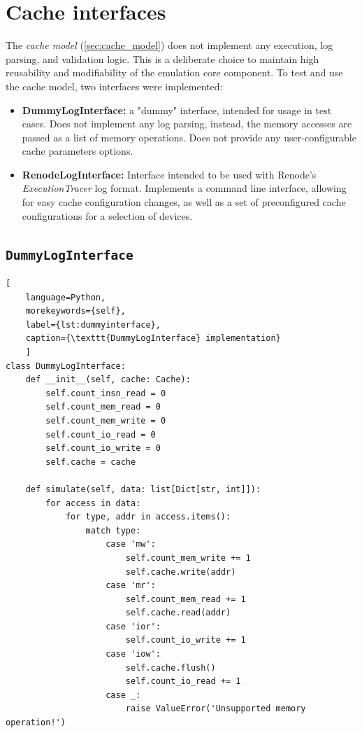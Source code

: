 \section{Cache interfaces}

The \textit{cache model} (\ref{sec:cache_model}) does not implement any execution, log parsing, and validation logic. This is a deliberate choice to maintain high reusability and modifiability
of the emulation core component. To test and use the cache model, two interfaces were implemented:

\begin{itemize}
	\item \textbf{DummyLogInterface:} a "dummy" interface, intended for usage in test cases. Does not implement any log parsing, instead, the memory accesses are passed as a list of
        memory operations. Does not provide any user-configurable cache parameters options.
    \item \textbf{RenodeLogInterface:} Interface intended to be used with Renode's \textit{ExecutionTracer} log format. Implements a command line interface, allowing for easy cache
        configuration changes, as well as a set of preconfigured cache configurations for a selection of devices.
\end{itemize}


\subsection{\texttt{DummyLogInterface}}

\begin{center}
\centering
\begin{minipage}{\linewidth}
\begin{lstlisting}[
    language=Python,
	morekeywords={self},
    label={lst:dummyinterface},
    caption={\texttt{DummyLogInterface} implementation}
    ]
class DummyLogInterface:
    def __init__(self, cache: Cache):
        self.count_insn_read = 0
        self.count_mem_read = 0
        self.count_mem_write = 0
        self.count_io_read = 0
        self.count_io_write = 0
        self.cache = cache

    def simulate(self, data: list[Dict[str, int]]):
        for access in data:
            for type, addr in access.items():
                match type:
                    case 'mw':
                        self.count_mem_write += 1
                        self.cache.write(addr)
                    case 'mr':
                        self.count_mem_read += 1
                        self.cache.read(addr)
                    case 'ior':
                        self.count_io_write += 1
                    case 'iow':
                        self.cache.flush()
                        self.count_io_read += 1
                    case _:
                        raise ValueError('Unsupported memory operation!')
\end{lstlisting}
\end{minipage}
\end{center}

